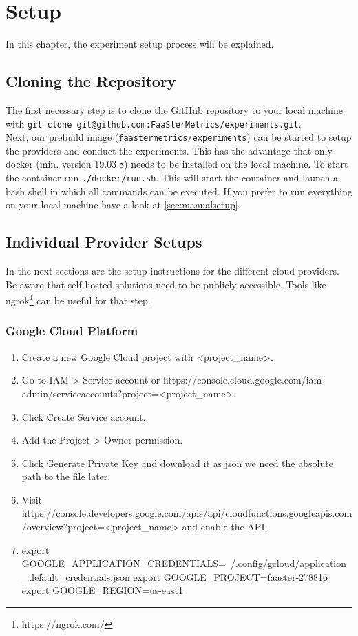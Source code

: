 \documentclass[../main.tex]{subfiles}
\begin{document}
\section{Setup}\label{sec:setup}
In this chapter, the experiment setup process will be explained.


\subsection{Cloning the Repository}\label{sec:clonesetup}
The first necessary step is to clone the GitHub repository to your local machine with \texttt{git clone git@github.com:FaaSterMetrics/experiments.git}. \\
Next, our prebuild image (\texttt{faastermetrics/experiments}) can be started to setup the providers and conduct the experiments. This has the advantage that only docker (min. version 19.03.8) needs to be installed on the local machine. To start the container run \texttt{./docker/run.sh}. This will start the container and launch a bash shell in which all commands can be executed.
If you prefer to run everything on your local machine have a look at \ref{sec:manualsetup}.

\subsection{Individual Provider Setups}\label{sec:providersetup}

In the next sections are the setup instructions for the different cloud providers. Be aware that self-hosted solutions need to be publicly accessible. Tools like ngrok\footnote{https://ngrok.com/} can be useful for that step.

\subsubsection{Google Cloud Platform}\label{sec:providersetupgcp}

\begin{enumerate}
\item Create a new Google Cloud project with <project\_name>.
\item Go to IAM > Service account or https://console.cloud.google.com/iam-admin/serviceaccounts?project=<project\_name>.
\item Click Create Service account.
\item Add the Project > Owner permission.
\item Click Generate Private Key and download it as json we need the absolute path to the file later.
\item Visit https://console.developers.google.com/apis/api/cloudfunctions.googleapis.com/overview?project=<project\_name> and enable the API.
\item export GOOGLE\_APPLICATION\_CREDENTIALS=~/.config/gcloud/application\_default\_credentials.json
export GOOGLE\_PROJECT=faaster-278816
export GOOGLE\_REGION=us-east1
\end{enumerate}
\end{document}
